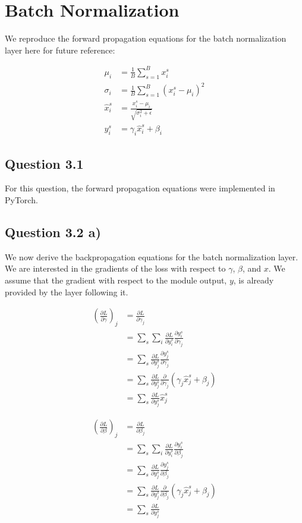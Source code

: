 \documentclass{article}
\newcommand{\pd}[2]{\frac{\partial #1}{\partial #2}}
\begin{document}
\section{Batch Normalization}

We reproduce the forward propagation equations for the batch normalization layer here for future reference:

\begin{align}
\mu_i &= \frac{1}{B}\sum_{s=1}^B x_i^s \\
\sigma_i &= \frac{1}{B}\sum_{s=1}^B (x_i^s - \mu_i)^2 \\
\hat{x}_i^s &= \frac{x_i^s -  \mu_i}{\sqrt{\sigma_i^2 + \epsilon}} \\
y_i^s &= \gamma_i\hat{x}_i^s + \beta_i
\end{align}

\subsection*{Question 3.1}

For this question, the forward propagation equations were implemented in PyTorch.

\subsection*{Question 3.2 a)}

We now derive the backpropagation equations for the batch normalization layer. We are interested in the gradients of the loss with respect to $\gamma$, $\beta$, and $x$. We assume that the gradient with respect to the module output, $y$, is already provided by the layer following it.

\begin{align*}
\left(\pd{L}{\gamma}\right)_j &= \pd{L}{\gamma_j} \\
&=
\sum_s\sum_i\pd{L}{y_i^s}\pd{y_i^s}{\gamma_j} \\
&=
\sum_s\pd{L}{y_j^s}\pd{y_j^s}{\gamma_j} \\
&= \sum_s\pd{L}{y_j^s}\pd{}{\gamma_j}(\gamma_j\hat{x}_j^s+\beta_j) \\
&= \sum_s\pd{L}{y_j^s}\hat{x}_j^s
\end{align*}

\begin{align*}
\left(\pd{L}{\beta}\right)_j &= \pd{L}{\beta_j} \\
&=
\sum_s\sum_i\pd{L}{y_i^s}\pd{y_i^s}{\beta_j} \\
&=
\sum_s\pd{L}{y_j^s}\pd{y_j^s}{\beta_j} \\
&= \sum_s\pd{L}{y_j^s}\pd{}{\beta_j}(\gamma_j\hat{x}_j^s+\beta_j) \\
&= \sum_s\pd{L}{y_j^s}
\end{align*}
\end{document}
